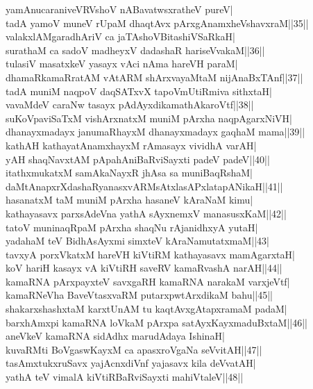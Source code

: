 \documentclass{article}
\begin{document}
yamAnucaraniveVRVshoV nABavatwsxratheV pureV|\\
tadA yamoV muneV rUpaM dhaqtAvx pArxgAnamxheVshavxraM||35||\\
valakxlAMgaradhAriV ca jaTAshoVBitashiVSaRkaH|\\
surathaM ca sadoV madheyxV dadashaR hariseVvakaM||36||\\
tulasiV masatxkeV yasayx vAci nAma hareVH paraM|\\
dhamaRkamaRratAM vAtARM shArxvayaMtaM nijAnaBxTAnf||37||\\
tadA muniM naqpoV daqSATxvX tapoVmUtiRmiva sithxtaH|\\
vavaMdeV caraNw tasayx pAdAyxdikamathAkaroVtf||38||\\
suKoVpaviSaTxM vishArxnatxM muniM pArxha naqpAgarxNiVH|\\
dhanayxmadayx janumaRhayxM dhanayxmadayx gaqhaM mama||39||\\
kathAH kathayatAnamxhayxM rAmasayx vividhA varAH|\\
yAH shaqNavxtAM pApahAniBaRviSayxti padeV padeV||40||\\
itathxmukatxM samAkaNayxR {j{hA}sa} sa muniBaqRshaM|\\
daMtAnapxrXdashaRyanasxvARMsAtxlasAPxlatapANikaH||41||\\
hasanatxM taM muniM pArxha hasaneV kAraNaM kimu|\\
kathayasavx parxsAdeVna yathA sAyxnemxV manasusxKaM||42||\\
tatoV muninaqRpaM pArxha shaqNu rAjanidhxyA yutaH|\\
yadahaM teV BidhAsAyxmi simxteV kAraNamutatxmaM||43|\\
tavxyA porxVkatxM hareVH kiVtiRM kathayasavx mamAgarxtaH|\\
koV hariH kasayx vA kiVtiRH saveRV kamaRvashA narAH||44||\\
kamaRNA pArxpayxteV savxgaRH kamaRNA narakaM varxjeVtf|\\
kamaRNeVha BaveVtasxvaRM putarxpwtArxdikaM bahu||45||\\
shakarxshashxtaM karxtUnAM tu kaqtAvxgAtapxramaM padaM|\\
barxhAmxpi kamaRNA loVkaM pArxpa satAyxKayxmaduBxtaM||46||\\
aneVkeV kamaRNA sidAdhx marudAdaya IshinaH|\\
kuvaRMti BoVgaswKayxM ca apasxroVgaNa seVvitAH||47||\\
tasAmxtukxruSavx yajAcnxdiVnf yajasavx kila deVvatAH|\\
yathA teV vimalA kiVtiRBaRviSayxti mahiVtaleV||48||\\
\end{document}
